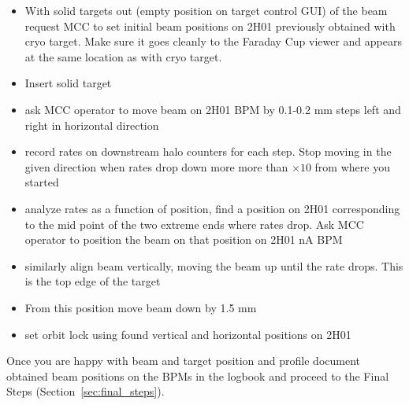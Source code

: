 \begin{itemize}
\item With solid targets out (empty position on target control GUI) of the beam request MCC to set initial beam positions on 2H01 previously obtained with cryo target. Make sure it goes cleanly to the Faraday Cup viewer and appears at the same location as with cryo target.
\item Insert solid target
\item ask MCC operator to move beam on 2H01 BPM by 0.1-0.2 mm steps left and right in horizontal direction
\item record rates on downstream halo counters for each step. Stop moving in the given direction when rates drop down more more than $\times 10$ from where you started 
\item analyze rates as a function of position, find a position on 2H01 corresponding to the mid point of the two extreme ends where rates drop. Ask MCC operator to position the beam on that position on 2H01 nA BPM
\item  similarly align beam vertically, moving the beam up until the rate drops. This is the top edge of the target
\item From this position move beam down by 1.5 mm
\item set orbit lock using found vertical and horizontal positions on 2H01 
\end{itemize}


Once you are happy with beam and target position and profile document obtained beam positions on the BPMs in the logbook and proceed to the Final Steps (Section~\ref{sec:final_steps}).



